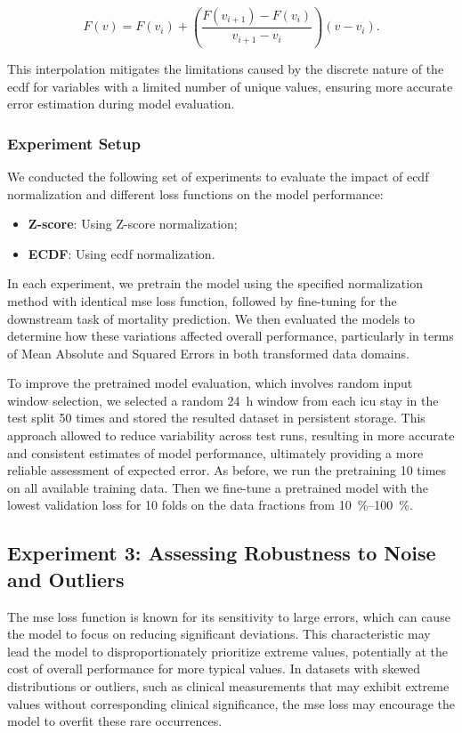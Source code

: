 \[
F(v) = F(v_i) + \left( \frac{F(v_{i+1}) - F(v_i)}{v_{i+1} - v_i} \right) (v - v_i).
\]

This interpolation mitigates the limitations caused by the discrete nature of the \gls{ecdf} for variables with a limited number of unique values, ensuring more accurate error estimation during model evaluation.

\subsubsection*{Experiment Setup}

We conducted the following set of experiments to evaluate the impact of \gls{ecdf} normalization and different loss functions on the model performance:

\begin{itemize}
    \item \textbf{Z-score}: Using Z-score normalization;
    \item \textbf{ECDF}: Using \gls{ecdf} normalization.
\end{itemize}

In each experiment, we pretrain the model using the specified normalization method with identical \gls{mse} loss function, followed by fine-tuning for the downstream task of mortality prediction. We then evaluated the models to determine how these variations affected overall performance, particularly in terms of Mean Absolute and Squared Errors in both transformed data domains.

To improve the pretrained model evaluation, which involves random input window selection, we selected a random \qty{24}{\hour} window from each \gls{icu} stay in the test split \num{50} times and stored the resulted dataset in persistent storage. This approach allowed to reduce variability across test runs, resulting in more accurate and consistent estimates of model performance, ultimately providing a more reliable assessment of expected error. As before, we run the pretraining \num{10} times on all available training data. Then we fine-tune a pretrained model with the lowest validation loss for \num{10} folds on the data fractions from \qtyrange{10}{100}{\percent}.

\subsection{Experiment 3: Assessing Robustness to Noise and Outliers}

The \gls{mse} loss function is known for its sensitivity to large errors, which can cause the model to focus on reducing significant deviations. This characteristic may lead the model to disproportionately prioritize extreme values, potentially at the cost of overall performance for more typical values. In datasets with skewed distributions or outliers, such as clinical measurements that may exhibit extreme values without corresponding clinical significance, the \gls{mse} loss may encourage the model to overfit these rare occurrences.

